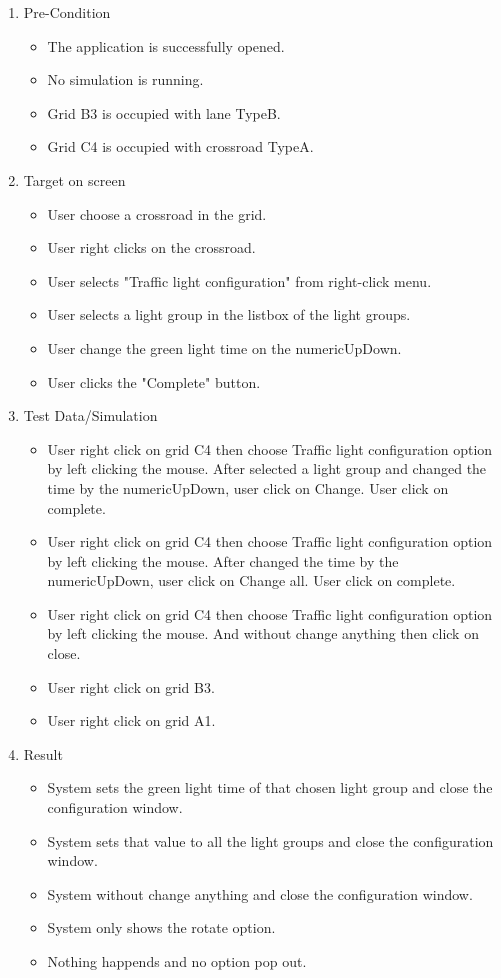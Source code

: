 \begin{enumerate}
	\item Pre-Condition
	\begin{itemize}
		\item The application is successfully opened.
		\item No simulation is running.
		\item Grid B3 is occupied with lane TypeB.
		\item Grid C4 is occupied with crossroad TypeA.
	\end{itemize}
	\item Target on screen
	\begin{itemize}
		\item User choose a crossroad in the grid.
		\item User right clicks on the crossroad.
		\item User selects "Traffic light configuration" from right-click menu.
		\item User selects a light group in the listbox of the light groups.
		\item User change the green light time on the numericUpDown.
		\item User clicks the "Complete" button. 
	\end{itemize}
	\item Test Data/Simulation
	\begin{itemize}
		\item User right click on grid C4 then choose Traffic light configuration  option by left clicking the mouse. After selected a light group and changed the time by the numericUpDown, user click on Change. User click on complete.
		\item User right click on grid C4 then choose Traffic light configuration option by left clicking the mouse. After changed the time by the numericUpDown, user click on Change all. User click on complete.
		\item User right click on grid C4 then choose Traffic light configuration option by left clicking the mouse. And without change anything then click on close. 
		\item User right click on grid B3. 
		\item User right click on grid A1.
	\end{itemize}
	\item Result
	\begin{itemize}
		\item System sets the green light time of that chosen light group and close the configuration window. 
		\item System sets that value to all the light groups and close the configuration window. 
		\item System without change anything and close the configuration window.
		\item System only shows the rotate option.
		\item Nothing happends and no option pop out.
		
	\end{itemize}
\end{enumerate}

